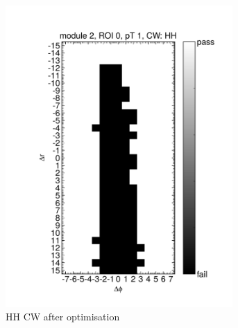 \begin{figure}[htbp]
\begin{subfigure}[b]{0.45\textwidth}
		\includegraphics[width=0.95\textwidth]{figures/muontrigger/l1mu4/cw_0028/cwplot_module2_roi0_pt1_cwHH.pdf}
		\caption{HH CW after optimisation}
	\end{subfigure}
	\begin{subfigure}[b]{0.45\textwidth}
		\centering

\end{subfigure}
\end{figure}

